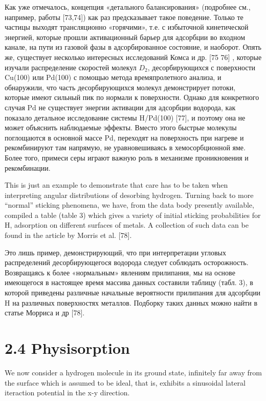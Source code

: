 \documentclass[11pt]{article}
\begin{document}
Как уже отмечалось, концепция «детального балансирования» (подробнее
см., например, работы {[}73,74{]}) как раз предсказывает такое
поведение. Только те частицы выходят трансляционно «горячими», т.е. с
избыточной кинетической энергией, которые прошли активационный барьер
для адсорбции во входном канале, на пути из газовой фазы в
адсорбированное состояние, и наоборот. Опять же, существует несколько
интересных исследований Комса и др. {[}75 76{]} , которые изучали
распределение скоростей молекул \(D_2\), десорбирующихся с поверхности
Cu(100) или Pd(100) с помощью метода времяпролетного анализа, и
обнаружили, что часть десорбирующихся молекул демонстрирует потоки,
которые имеют сильный пик по нормали к поверхности. Однако для
конкретного случая Pd не существует энергии активации для адсорбции
водорода, как показало детальное исследование системы H/Pd(100)
{[}77{]}, и поэтому она не может объяснить наблюдаемые эффекты. Вместо
этого быстрые молекулы поглощаются в основной массе Pd, переходят на
поверхность при нагреве и рекомбинируют там напрямую, не уравновешиваясь
в хемосорбционной яме. Более того, примеси серы играют важную роль в
механизме проникновения и рекомбинации.

This is just an example to demonstrate that care has to be taken when
interpreting angular distributions of desorbing hydrogen. Turning back
to more ``normal'' sticking phenomena, we have, from the data body
presently available, compiled a table (table 3) which gives a variety of
initial sticking probabilities for H, adsorption on different surfaces
of metals. A collection of such data can be found in the article by
Morris et al. {[}78{]}.

Это лишь пример, демонстрирующий, что при интерпретации угловых
распределений десорбирующегося водорода следует соблюдать осторожность.
Возвращаясь к более «нормальным» явлениям прилипания, мы на основе
имеющегося в настоящее время массива данных составили таблицу (табл. 3),
в которой приведены различные начальные вероятности прилипания для
адсорбции H на различных поверхностях металлов. Подборку таких данных
можно найти в статье Морриса и др {[}78{]}.

    \section{2.4 Physisorption}\label{physisorption}

We now consider a hydrogen molecule in its ground state, infinitely far
away from the surface which is assumed to be ideal, that is, exhibits a
sinusoidal lateral iteraction potential in the x-y direction.
\end{document}

